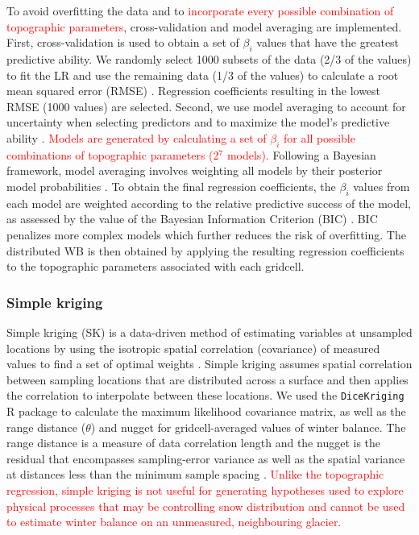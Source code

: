 \documentclass[twocolumn, letterpaper]{igs}
\begin{document}
To avoid overfitting the data and to \textcolor{red}{ incorporate every possible combination of topographic parameters}, cross-validation and model averaging are implemented. First, cross-validation is used to obtain a set of $\beta_i$ values that have the greatest predictive ability. We randomly select 1000 subsets of the data (2/3 of the values) to fit the LR and use the remaining data (1/3 of the values) to calculate a root mean squared error (RMSE) \citep{Kohavi1995}. Regression coefficients resulting in the lowest RMSE (1000 values) are selected. Second, we use model averaging to account for uncertainty when selecting predictors and to maximize the model's predictive ability \citep{Madigan1994}.  \textcolor{red}{Models are generated by calculating a set of $\beta_i$ for all possible combinations of topographic parameters (2$^7$ models).} Following a Bayesian framework, model averaging involves weighting all models by their posterior model probabilities \citep{Raftery1997}. To obtain the final regression coefficients, the $\beta_i$ values from each model are weighted according to the relative predictive success of the model, as assessed by the value of the Bayesian Information Criterion (BIC) \citep{Burnham2004}. BIC penalizes more complex models which further reduces the risk of overfitting. The distributed WB is then obtained by applying the resulting regression coefficients to the topographic parameters associated with each gridcell. 

\subsubsection{Simple kriging}

Simple kriging (SK) is a data-driven method of estimating variables at unsampled locations by using the isotropic spatial correlation (covariance) of measured values to find a set of optimal weights \citep{Davis1986, Li2008}. Simple kriging assumes spatial correlation between sampling locations that are distributed across a surface and then applies the correlation to interpolate between these locations. We used the \texttt{DiceKriging} R package \citep{Roustant2012} to calculate the maximum likelihood covariance matrix, as well as the range distance ($\theta$) and nugget for gridcell-averaged values of winter balance. The range distance is a measure of data correlation length and the nugget is the residual that encompasses sampling-error variance as well as the spatial variance at distances less than the minimum sample spacing \citep{Li2008}. \textcolor{red}{Unlike the topographic regression, simple kriging is not useful for generating hypotheses used to explore physical processes that may be controlling snow distribution and cannot be used to estimate winter balance on an unmeasured, neighbouring glacier.} 
\end{document}
